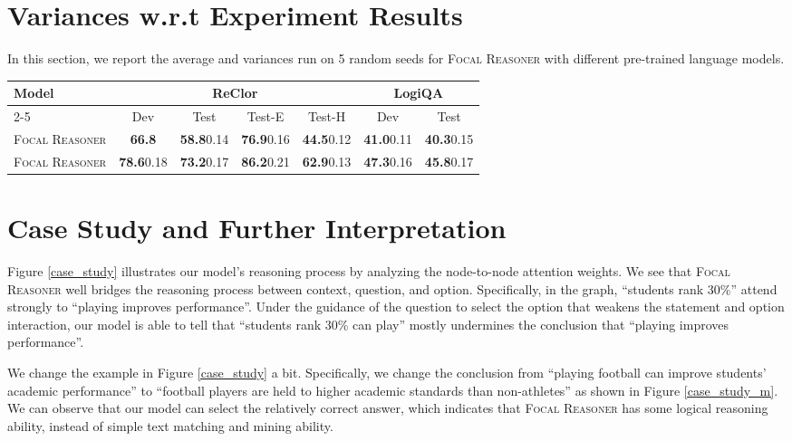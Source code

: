 \documentclass[11pt]{article}
\begin{document}
\section{Variances w.r.t Experiment Results} \label{variances}
In this section, we report the average and variances run on 5 random seeds for \textsc{Focal Reasoner} with different pre-trained language models.

\begin{table*}[htb]

\setlength{\belowcaptionskip}{5pt}
\caption{Experimental results for \textsc{Focal Reasoner} with average results and variances run no 5 random seeds.}
\centering\centering\setlength{\tabcolsep}{3.0pt}
\vskip 0.1in
\begin{tabular}{lcccccc}
\toprule
\multirow{2}{*}{Model} &
\multicolumn{4}{c}{ReClor} & \multicolumn{2}{c}{LogiQA}\\
\cmidrule{2-5}
\cmidrule{6-7}
 & Dev & Test & Test-E & Test-H & Dev & Test \\ 
\midrule
\textsc{Focal Reasoner}&\textbf{66.8} & \textbf{58.8}0.14&\textbf{76.9}0.16&\textbf{44.5}0.12 & \textbf{41.0}0.11&\textbf{40.3}0.15\\
\textsc{Focal Reasoner}&\textbf{78.6}0.18 & \textbf{73.2}0.17&\textbf{86.2}0.21&\textbf{62.9}0.13 & \textbf{47.3}0.16&\textbf{45.8}0.17\\


\bottomrule
\end{tabular}

\end{table*}

\section{Case Study and Further Interpretation} \label{interpretation}
Figure \ref{case_study} illustrates our model's reasoning process by analyzing the node-to-node attention weights. We see that \textsc{Focal Reasoner} well bridges the reasoning process between context, question, and option. Specifically, in the graph, ``students rank 30\%'' attend strongly to ``playing improves performance''. Under the guidance of the question to select the option that weakens the statement and option interaction, our model is able to tell that ``students rank 30\% can play'' mostly undermines the conclusion that ``playing improves performance''.

We change the example in Figure \ref{case_study} a bit. Specifically, we change the conclusion from ``playing football can improve students' academic performance'' to ``football players are held to higher academic standards than non-athletes'' as shown in Figure \ref{case_study_m}. We can observe that our model can select the relatively correct answer, which indicates that \textsc{Focal Reasoner} has some logical reasoning ability, instead of simple text matching and mining ability.
\end{document}
